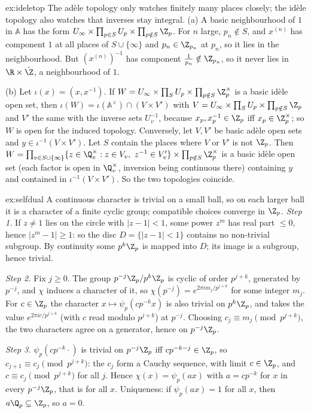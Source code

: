 \begin{solution}{ex:ideletop}
\idea The ad\`ele topology only watches finitely many places closely; the id\`ele topology also watches that inverses stay integral.
\writeup (a) A basic neighbourhood of $1$ in $\mathbb{A}$ has the form $U_\infty\times\prod_{p\in S}U_p\times\prod_{p\notin S}\Z_p$. For $n$ large, $p_n\notin S$, and $x^{(n)}$
has component $1$ at all places of $S\cup\{\infty\}$ and $p_n\in\Z_{p_n}$ at $p_n$, so it lies in the neighbourhood. But $(x^{(n)})^{-1}$ has component
$\frac1{p_n}\notin\Z_{p_n}$, so it never lies in $\R\times\hat{\Z}$, a neighbourhood of $1$.

(b) Let $\iota(x)=(x,x^{-1})$. If $W=U_\infty\times\prod_{S}U_p\times\prod_{p\notin S}\Z_p^\times$ is a basic id\`ele open set, then $\iota(W)=\iota(\mathbb{A}^\times)\cap(V\times V')$
with $V=U_\infty\times\prod_SU_p\times\prod_{p\notin S}\Z_p$ and $V'$ the same with the inverse sets $U_v^{-1}$, because $x_p,x_p^{-1}\in\Z_p$ iff $x_p\in\Z_p^\times$; so
$W$ is open for the induced topology. Conversely, let $V,V'$ be basic ad\`ele open sets and $y\in\iota^{-1}(V\times V')$. Let $S$ contain the places where $V$ or $V'$ is not
$\Z_p$. Then $W=\prod_{v\in S\cup\{\infty\}}\{z\in\Q_v^\times:z\in V_v,\ z^{-1}\in V'_v\}\times\prod_{p\notin S}\Z_p^\times$ is a basic id\`ele open set (each factor is open in
$\Q_v^\times$, inversion being continuous there) containing $y$ and contained in $\iota^{-1}(V\times V')$. So the two topologies coincide.
\end{solution}

\begin{solution}{ex:selfdual}
\idea A continuous character is trivial on a small ball, so on each larger ball it is a character of a finite cyclic group; compatible choices converge in $\Z_p$.
\writeup \emph{Step 1.} If $z\ne1$ lies on the circle with $|z-1|<1$, some power $z^m$ has real part $\le0$, hence $|z^m-1|\ge1$: so the disc $D=\{|z-1|<1\}$ contains no
non-trivial subgroup. By continuity some $p^k\Z_p$ is mapped into $D$; its image is a subgroup, hence trivial.

\emph{Step 2.} Fix $j\ge0$. The group $p^{-j}\Z_p/p^k\Z_p$ is cyclic of order $p^{j+k}$, generated by $p^{-j}$, and $\chi$ induces a character of it, so
$\chi(p^{-j})=e^{2\pi im_j/p^{j+k}}$ for some integer $m_j$. For $c\in\Z_p$ the character $x\mapsto\psi_p(cp^{-k}x)$ is also trivial on $p^k\Z_p$, and takes the
value $e^{2\pi ic/p^{j+k}}$ (with $c$ read modulo $p^{j+k}$) at $p^{-j}$. Choosing $c_j\equiv m_j\pmod{p^{j+k}}$, the two characters agree on a generator, hence on
$p^{-j}\Z_p$.

\emph{Step 3.} $\psi_p(cp^{-k}\cdot)$ is trivial on $p^{-j}\Z_p$ iff $cp^{-k-j}\in\Z_p$, so $c_{j+1}\equiv c_j\pmod{p^{j+k}}$: the $c_j$ form a Cauchy sequence, with
limit $c\in\Z_p$, and $c\equiv c_j\pmod{p^{j+k}}$ for all $j$. Hence $\chi(x)=\psi_p(ax)$ with $a=cp^{-k}$ for $x$ in every $p^{-j}\Z_p$, that is for all $x$.
Uniqueness: if $\psi_p(ax)=1$ for all $x$, then $a\Q_p\subseteq\Z_p$, so $a=0$.
\end{solution}

